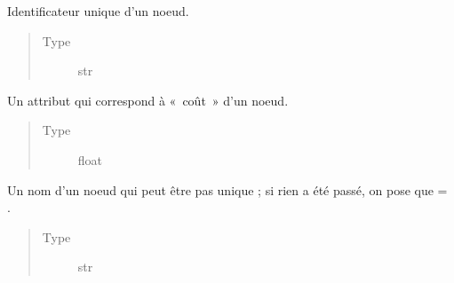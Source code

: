\documentclass[letterpaper,10pt,french]{sphinxmanual}
\begin{document}
\begin{fulllineitems}
\begin{quote}
\begin{description}
\begin{itemize}
\end{itemize}

\end{description}\end{quote}

\begin{fulllineitems}
\label{\detokenize{index:StrategyTree.Observation._id}}
Identificateur unique d’un noeud.
\begin{quote}\begin{description}
\item[{Type}] \leavevmode
str

\end{description}\end{quote}

\end{fulllineitems}


\begin{fulllineitems}
\label{\detokenize{index:StrategyTree.Observation._cost}}
Un attribut qui correspond à « coût » d’un noeud.
\begin{quote}\begin{description}
\item[{Type}] \leavevmode
float

\end{description}\end{quote}

\end{fulllineitems}


\begin{fulllineitems}
\label{\detokenize{index:StrategyTree.Observation._name}}
Un nom d’un noeud qui peut être pas unique ; si rien a été passé, on pose que  = .
\begin{quote}\begin{description}
\item[{Type}] \leavevmode
str


\end{description}
\end{quote}
\end{fulllineitems}
\end{fulllineitems}
\end{document}
